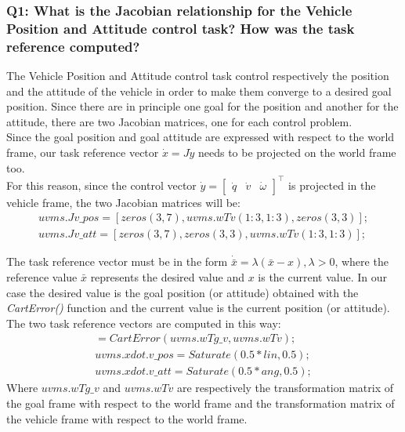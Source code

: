 \documentclass{article}
\begin{document}
\subsubsection{Q1: What is the Jacobian relationship for the Vehicle Position and Attitude control task? How was the task reference computed?}

The Vehicle Position and Attitude control task control respectively the position and the attitude of the vehicle in order to make them converge to a desired goal position. Since there are in principle one goal for the position and another for the attitude, there are two Jacobian matrices, one for each control problem. \\
Since the goal position and goal attitude are expressed with respect to the world frame, our task reference vector $ \dot{x} = J\dot{y} $ needs to be projected on the world frame too. \\
For this reason, since the control vector $ \dot{y} = \begin{bmatrix} \dot{q} & \dot{v} & \dot{\omega}\end{bmatrix}^\top $ is projected in the vehicle frame, the two Jacobian matrices will be:
\begin{gather*}
uvms.Jv\_pos = [zeros(3, 7), uvms.wTv(1:3, 1:3), zeros(3,3)]; \\
uvms.Jv\_att = [zeros(3, 7), zeros(3, 3), uvms.wTv(1:3, 1:3)];
\end{gather*}

The task reference vector must be in the form $ \dot{\bar{x}} = \lambda(\bar{x} - x), \lambda > 0 $, where the reference value $ \bar{x} $ represents the desired value and $ x $ is the current value. In our case the desired value is the goal position (or attitude) obtained with the \textit{CartError()} function and the current value is the current position (or attitude). \\
The two task reference vectors are computed in this way:
\begin{gather*}
[ang, lin] = CartError(uvms.wTg\_v , uvms.wTv); \\
uvms.xdot.v\_pos = Saturate(0.5 * lin, 0.5); \\
uvms.xdot.v\_att = Saturate(0.5 * ang, 0.5);
\end{gather*}
Where $ uvms.wTg\_v $ and $ uvms.wTv $ are respectively the transformation matrix of the goal frame with respect to the world frame and the transformation matrix of the vehicle frame with respect to the world frame. 
\end{document}
